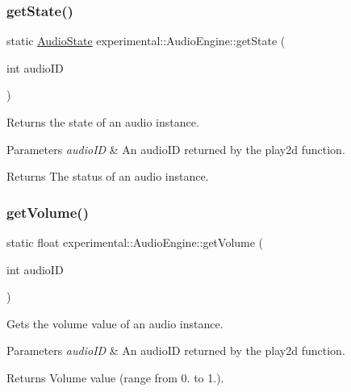 \subsubsection{\texorpdfstring{get\+State()}{getState()}\hspace{0.1cm}{\footnotesize\ttfamily [2/2]}}
{\footnotesize\ttfamily static \hyperlink{classexperimental_1_1AudioEngine_ab7becf9cab1f5e4cac089a1f6e3785e6}{Audio\+State} experimental\+::\+Audio\+Engine\+::get\+State (\begin{DoxyParamCaption}\item[{int}]{audio\+ID }\end{DoxyParamCaption})\hspace{0.3cm}{\ttfamily [static]}}

Returns the state of an audio instance.


\begin{DoxyParams}{Parameters}
{\em audio\+ID} & An audio\+ID returned by the play2d function. \\
\hline
\end{DoxyParams}
\begin{DoxyReturn}{Returns}
The status of an audio instance. 
\end{DoxyReturn}
\mbox{\label{classexperimental_1_1AudioEngine_ab6545ae46e79147482bb50861c91e5e9}} 
\subsubsection{\texorpdfstring{get\+Volume()}{getVolume()}\hspace{0.1cm}{\footnotesize\ttfamily [1/2]}}
{\footnotesize\ttfamily static float experimental\+::\+Audio\+Engine\+::get\+Volume (\begin{DoxyParamCaption}\item[{int}]{audio\+ID }\end{DoxyParamCaption})\hspace{0.3cm}{\ttfamily [static]}}

Gets the volume value of an audio instance.


\begin{DoxyParams}{Parameters}
{\em audio\+ID} & An audio\+ID returned by the play2d function. \\
\hline
\end{DoxyParams}
\begin{DoxyReturn}{Returns}
Volume value (range from 0. to 1.). 
\end{DoxyReturn}
\mbox{\label{classexperimental_1_1AudioEngine_ab6545ae46e79147482bb50861c91e5e9}} 
